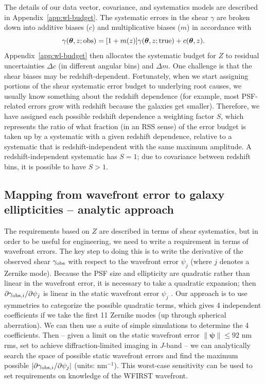 \documentclass[usenatbib]{mnras}
\begin{document}
The details of our data vector, covariance, and systematics models are described in Appendix~\ref{app:wl-budget}. The systematic errors in the shear $\gamma$ are broken down into additive biases ($c$) and multiplicative biases ($m$) in accordance with
\begin{equation}
\gamma({\boldsymbol\theta},z;{\rm obs}) = [1+m(z)] \gamma({\boldsymbol\theta},z;{\rm true}) + c({\boldsymbol\theta},z).
\label{eq:gmod}
\end{equation}
Appendix~\ref{app:wl-budget} then allocates the systematic budget for $Z$ to residual uncertainties $\Delta c$ (in different angular bins) and $\Delta m$. One challenge is that the shear biases may be redshift-dependent. Fortunately, when we start assigning portions of the shear systematic error budget to underlying root causes, we usually know something about the redshift dependence (for example, most PSF-related errors grow with redshift because the galaxies get smaller). Therefore, we have assigned each possible redshift dependence a weighting factor $S$, which represents the ratio of what fraction (in an RSS sense) of the error budget is taken up by a systematic with a given redshift dependence, relative to a systematic that is redshift-independent with the same maximum amplitude. A redshift-independent systematic has $S=1$; due to covariance between redshift bins, it is possible to have $S>1$.

\subsection{Mapping from wavefront error to galaxy ellipticities -- analytic approach}
\label{ss:dedZ}

The requirements based on $Z$ are described in terms of shear systematics, but in order to be useful for engineering, we need to write a requirement in terms of wavefront errors. The key step to doing this is to write the derivative of the observed shear $\gamma_{\rm obs}$ with respect to the wavefront error $\psi_j$ (where $j$ denotes a Zernike mode). Because the PSF size and ellipticity are quadratic rather than linear in the wavefront error, it is necessary to take a quadratic expansion; then $\partial\gamma_{{\rm obs},i}/\partial\psi_j$ is linear in the static wavefront error $\psi_j$ \citep{2010SPIE.7731E..1EN}. Our approach is to use symmetries to categorize the possible quadratic terms, which gives 4 independent coefficients if we take the first 11 Zernike modes (up through spherical aberration). We can then use a suite of simple simulations to determine the 4 coefficients. Then -- given a limit on the static wavefront error $\lVert{\boldsymbol\psi}\rVert \le 92$ nm rms, set to achieve diffraction-limited imaging in $J$-band -- we can analytically search the space of possible static wavefront errors and find the maximum possible $|\partial\gamma_{{\rm obs},i}/\partial\psi_j|$ (units: nm$^{-1}$). This worst-case sensitivity can be used to set requirements on knowledge of the WFIRST wavefront.
\end{document}
